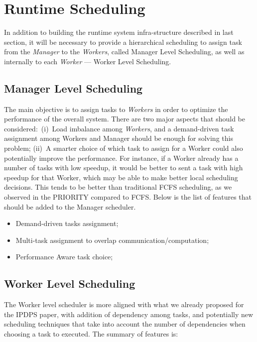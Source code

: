 \section{Runtime Scheduling}

In addition to building the runtime system infra-structure described in last
section, it will be necessary to provide a hierarchical scheduling to assign
task from the \emph{Manager} to the \emph{Workers}, called Manager Level
Scheduling, as well as internally to each \emph{Worker} --- Worker Level Scheduling. 

\subsection{Manager Level Scheduling}

The main objective is to assign tasks to \emph{Workers} in order to optimize
the performance of the overall system. There are two major aspects that should
be considered:~(i)~Load imbalance among \emph{Workers}, and a demand-driven
task assignment among Workers and Manager should be enough for solving this
problem; (ii)~A smarter choice of which task to assign for a Worker could also
potentially improve the performance. For instance, if a Worker already has a
number of tasks with low speedup, it would be better to sent a task with high
speedup for that Worker, which may be able to make better local scheduling
decisions. This tends to be better than traditional FCFS scheduling, as we
observed in the PRIORITY compared to FCFS.  Below is the list of features that
should be added to the Manager scheduler.

\begin{itemize}
	\item Demand-driven tasks assignment;

	\item Multi-task assignment to overlap communication/computation;

	\item Performance Aware task choice;
\end{itemize}

\subsection{Worker Level Scheduling}

The Worker level scheduler is more aligned with what we already proposed for 
the IPDPS paper, with addition of dependency among tasks, and potentially new
scheduling techniques that take into account the number of dependencies when
choosing a task to executed. The summary of features is:

